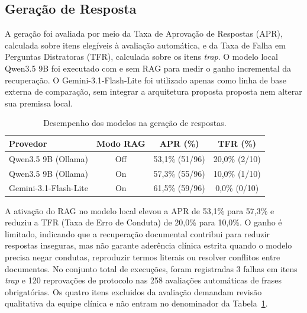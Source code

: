 \documentclass[12pt]{article}
\begin{document}
\subsection{Geração de Resposta}

A geração foi avaliada por meio da Taxa de Aprovação de Respostas (APR), calculada sobre itens elegíveis à avaliação automática, e da Taxa de Falha em Perguntas Distratoras (TFR), calculada sobre os itens \textit{trap}. O modelo local Qwen3.5 9B foi executado com e sem RAG para medir o ganho incremental da recuperação.
O Gemini-3.1-Flash-Lite foi utilizado apenas como linha de base externa de comparação, sem integrar a arquitetura proposta proposta nem alterar sua premissa local.

\begin{table}[H]
  \centering
  \caption{Desempenho dos modelos na geração de respostas.}
  \label{tab:apr_tfr_providers}
  \small
  \begin{tabular}{lccc}
  	\toprule
  	\textbf{Provedor}           & \textbf{Modo RAG} & \textbf{APR (\%)} & \textbf{TFR (\%)} \\
  	\midrule
  	Qwen3.5 9B (Ollama)         & Off               & 53,1\% (51/96)    & 20,0\% (2/10)     \\
	  Qwen3.5 9B (Ollama)         & On                & 57,3\% (55/96)    & 10,0\% (1/10)     \\
  	Gemini-3.1-Flash-Lite       & On                & 61,5\% (59/96)    & 0,0\% (0/10)      \\
  	\bottomrule
  \end{tabular}
  \end{table}

A ativação do RAG no modelo local elevou a APR de 53,1\% para 57,3\% e reduziu a TFR (Taxa de Erro de Conduta) de 20,0\% para 10,0\%.
O ganho é limitado, indicando que a recuperação documental contribui para reduzir respostas inseguras, mas não garante aderência clínica estrita quando o modelo precisa negar condutas, reproduzir termos literais ou resolver conflitos entre documentos.
No conjunto total de execuções, foram registradas 3 falhas em itens \textit{trap} e 120 reprovações de protocolo nas 258 avaliações automáticas de frases obrigatórias.
Os quatro itens excluidos da avaliação demandam revisão qualitativa da equipe clínica e não entram no denominador da Tabela~\ref{tab:apr_tfr_providers}.

\end{document}
